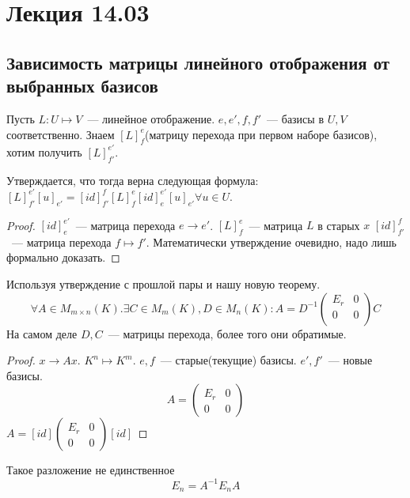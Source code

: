 \section{Лекция 14.03}
\subsection{Зависимость матрицы линейного отображения от выбранных базисов}
\begin{theorem}
    Пусть $L: U\mapsto V$~--- линейное отображение. 
    $e, e', f, f'$~--- базисы в $U, V$ соответственно.
    Знаем $[L]^e_f$(матрицу перехода при первом наборе базисов), хотим
    получить $[L]^{e'}_{f'}$.

    Утверждается, что тогда верна следующая формула:
    $[L]^{e'}_{f'}[u]_{e'}=[id]_{f'}^{f}[L]_f^{e}[id]_e^{e'}[u]_{e'}\forall u\in U$.
\end{theorem}
\begin{proof}
    $[id]_{e}^{e'}$~--- матрица перехода $e\rightarrow e'$.
    $[L]_f^e$~--- матрица $L$ в старых $x$
    $[id]_{f'}^f$~--- матрица перехода $f\mapsto f'$.
    Математически утверждение очевидно, надо лишь формально доказать.
\end{proof}
\begin{follow}
    Используя утверждение с прошлой пары и нашу новую теорему.
    $$\forall A\in M_{m\times n}(K).
    \exists C\in M_m(K), D\in M_n(K)\colon A = D^{-1}
    \left(\begin{array}{c|c}
            E_r & 0\\
            \hline
            0 & 0\\
    \end{array}\right) C$$
    На самом деле $D, C$~--- матрицы перехода, более того они
    обратимые.
\end{follow}
\begin{proof}
    $x\rightarrow Ax$.
    $K^n\mapsto K^m$.
    $e, f$~--- старые(текущие) базисы.
    $e', f'$~--- новые базисы.
    $$A = 
    \left(\begin{array}{c|c}
            E_r & 0\\
            \hline
            0 & 0
    \end{array}\right)
    $$
    $A = [id]\begin{pmatrix}
        E_r & 0\\
        0 & 0
    \end{pmatrix}[id]$
\end{proof}
\begin{remark}
    Такое разложение не единственное
    $$
    E_n = A^{-1}E_nA
    $$
\end{remark}

